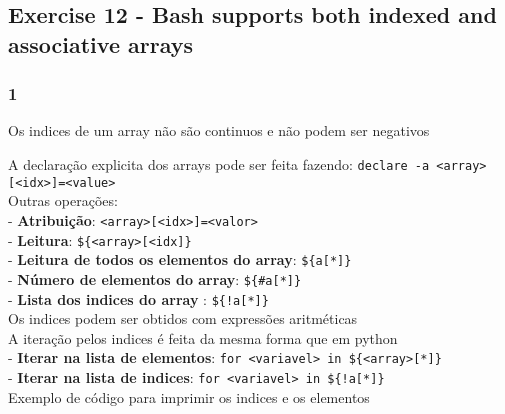 \documentclass[]{article}
\newenvironment{Shaded}{}{}
\newcommand{\KeywordTok}[1]{\textcolor[rgb]{0.00,0.44,0.13}{\textbf{{#1}}}}
\newcommand{\StringTok}[1]{\textcolor[rgb]{0.25,0.44,0.63}{{#1}}}
\newcommand{\OtherTok}[1]{\textcolor[rgb]{0.00,0.44,0.13}{{#1}}}
\newcommand{\NormalTok}[1]{{#1}}
\begin{document}
\subsection{Exercise 12 - Bash supports both indexed and associative
arrays}\label{exercise-12---bash-supports-both-indexed-and-associative-arrays}

\subsubsection{1}\label{section-22}

Os indices de um array não são continuos e não podem ser negativos

A declaração explicita dos arrays pode ser feita fazendo:
\texttt{declare -a \textless{}array\textgreater{}{[}\textless{}idx\textgreater{}{]}=\textless{}value\textgreater{}}\\
Outras operações:\\- \textbf{Atribuição}:
\texttt{\textless{}array\textgreater{}{[}\textless{}idx\textgreater{}{]}=\textless{}valor\textgreater{}}\\-
\textbf{Leitura}:
\texttt{\$\{\textless{}array\textgreater{}{[}\textless{}idx{]}\}}\\-
\textbf{Leitura de todos os elementos do array}:
\texttt{\$\{a{[}*{]}\}}\\- \textbf{Número de elementos do array}:
\texttt{\$\{\#a{[}*{]}\}}\\- \textbf{Lista dos indices do array} :
\texttt{\$\{!a{[}*{]}\}}\\

Os indices podem ser obtidos com expressões aritméticas\\A iteração
pelos indices é feita da mesma forma que em python\\- \textbf{Iterar na
lista de elementos}:
\texttt{for \textless{}variavel\textgreater{} in \$\{\textless{}array\textgreater{}{[}*{]}\}}\\-
\textbf{Iterar na lista de indices}:
\texttt{for \textless{}variavel\textgreater{} in \$\{!a{[}*{]}\}}\\
Exemplo de código para imprimir os indices e os elementos

\begin{Shaded}
\end{Shaded}
\end{document}
